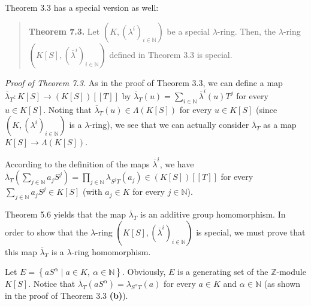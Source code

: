 \documentclass[12pt,final,notitlepage,onecolumn,german]{article}%
\begin{document}
Theorem 3.3 has a special version as well:

\begin{quote}
\textbf{Theorem 7.3.} Let $\left(  K,\left(  \lambda^{i}\right)
_{i\in\mathbb{N}}\right)  $ be a special $\lambda$-ring. Then, the $\lambda
$-ring $\left(  K\left[  S\right]  ,\left(  \overline{\lambda}^{i}\right)
_{i\in\mathbb{N}}\right)  $ defined in Theorem 3.3 is special.
\end{quote}

\textit{Proof of Theorem 7.3.} As in the proof of Theorem 3.3, we can define a
map $\overline{\lambda}_{T}:K\left[  S\right]  \rightarrow\left(  K\left[
S\right]  \right)  \left[  \left[  T\right]  \right]  $ by $\overline{\lambda
}_{T}\left(  u\right)  =\sum\limits_{i\in\mathbb{N}}\overline{\lambda}%
^{i}\left(  u\right)  T^{j}$ for every $u\in K\left[  S\right]  $. Noting that
$\overline{\lambda}_{T}\left(  u\right)  \in\Lambda\left(  K\left[  S\right]
\right)  $ for every $u\in K\left[  S\right]  $ (since $\left(  K,\left(
\lambda^{i}\right)  _{i\in\mathbb{N}}\right)  $ is a $\lambda$-ring), we see
that we can actually consider $\overline{\lambda}_{T}$ as a map $K\left[
S\right]  \rightarrow\Lambda\left(  K\left[  S\right]  \right)  $.

According to the definition of the maps $\overline{\lambda}^{i}$, we have
$\overline{\lambda}_{T}\left(  \sum\limits_{j\in\mathbb{N}}a_{j}S^{j}\right)
=\prod\limits_{j\in\mathbb{N}}\lambda_{S^{j}T}\left(  a_{j}\right)  \in\left(
K\left[  S\right]  \right)  \left[  \left[  T\right]  \right]  $ for every
$\sum\limits_{j\in\mathbb{N}}a_{j}S^{j}\in K\left[  S\right]  $ (with
$a_{j}\in K$ for every $j\in\mathbb{N}$).

Theorem 5.6 yields that the map $\overline{\lambda}_{T}$ is an additive group
homomorphism. In order to show that the $\lambda$-ring $\left(  K\left[
S\right]  ,\left(  \overline{\lambda}^{i}\right)  _{i\in\mathbb{N}}\right)  $
is special, we must prove that this map $\overline{\lambda}_{T}$ is a
$\lambda$-ring homomorphism.

Let $E=\left\{  aS^{\alpha}\mid a\in K,\ \alpha\in\mathbb{N}\right\}  $.
Obviously, $E$ is a generating set of the $\mathbb{Z}$-module $K\left[
S\right]  $. Notice that $\overline{\lambda}_{T}\left(  aS^{\alpha}\right)
=\lambda_{S^{\alpha}T}\left(  a\right)  $ for every $a\in K$ and $\alpha
\in\mathbb{N}$ (as shown in the proof of Theorem 3.3 \textbf{(b)}).
\end{document}
